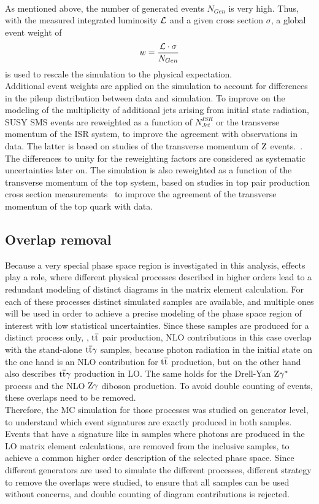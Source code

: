 \\
As mentioned above, the number of generated events $N_{Gen}$ is very high. Thus, with the measured integrated luminosity $\mathcal{L}$  and a given cross section $\sigma$, a global event weight of
\begin{equation}
 w = \frac{\mathcal{L} \cdot \sigma}{N_{Gen}}
\end{equation}
is used to rescale the simulation to the physical expectation.\\
Additional event weights are applied on the simulation to account for differences in the pileup distribution between data and simulation. To improve on the \MADGRAPH modeling of the multiplicity of additional jets arising from initial state radiation, SUSY SMS events are reweighted as a function of $N^{ISR}_{Jet}$ or the transverse momentum of the ISR system, to improve the agreement with observations in data.
The latter is based on studies of the transverse momentum of $\mathrm{Z}$ events.~\cite{NISRweight}.
The differences to unity for the reweighting factors are considered as systematic uncertainties later on.
The \POWHEG \ttbar simulation is also reweighted as a function of the transverse momentum of the top system, based on studies in top pair production cross section measurements~\cite{topWeight1,topWeight2,topWeight3,topWeight4} to improve the agreement of the transverse momentum of the top quark with data.

\subsection*{Overlap removal}\label{sec:overlap}

Because a very special phase space region is investigated in this analysis, effects play a role, where different physical processes described in higher orders lead to a redundant modeling of distinct diagrams in the matrix element calculation. For each of these processes distinct simulated samples are available, and multiple ones will be used in order to achieve a precise modeling of the phase space region of interest with low statistical uncertainties. Since these samples are produced for a distinct process only, \eg, ${\mathrm{t}\overline{\mathrm{t}}}$ pair production, NLO contributions in this case overlap with the stand-alone ${\mathrm{t}\overline{\mathrm{t}}}\gamma$ samples, because photon radiation in the initial state on the one hand is an NLO contribution for ${\mathrm{t}\overline{\mathrm{t}}}$ production, but on the other hand also describes ${\mathrm{t}\overline{\mathrm{t}}}\gamma$ production in LO. The same holds for the Drell-Yan $\mathrm{Z}\gamma^{*}$ process and the NLO $\mathrm{Z}\gamma$ diboson production. To avoid double counting of events, these overlaps need to be removed.\\
Therefore, the MC simulation for those processes was studied on generator level, to understand which event signatures are exactly produced in both samples. Events that have a signature like in samples where photons are produced in the LO matrix element calculations, are removed from the inclusive samples, to achieve a common higher order description of the selected phase space. Since different generators are used to simulate the different processes, different strategy to remove the overlaps were studied, to ensure that all samples can be used without concerns, and double counting of diagram contributions is rejected.


